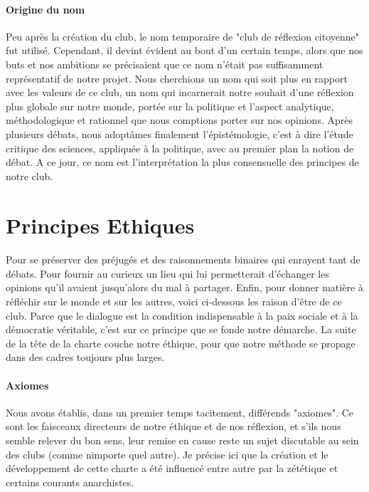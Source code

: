 \documentclass[a4paper,12pt]{article}
\begin{document}
\paragraph{Origine du nom}
Peu après la création du club, le nom temporaire de "club de réflexion citoyenne" fut utilisé. Cependant, il devint évident au bout d'un certain temps, alors que nos buts et nos ambitions se précisaient que ce nom n'était pas suffisamment représentatif de notre projet. Nous cherchions un nom qui soit plus en rapport avec les valeurs de ce club, un nom qui incarnerait notre souhait d'une réflexion plus globale sur notre monde, portée sur la politique et l'aspect analytique, méthodologique et rationnel que nous comptions porter sur nos opinions. Après plusieurs débats, nous adoptâmes finalement l'épistémologie, c'est à dire l'étude critique des sciences, appliquée à la politique, avec au premier plan la notion de débat. A ce jour, ce nom est l'interprétation la plus consensuelle des principes de notre club.
  
\section{Principes Ethiques}
\paragraph{} 
Pour se préserver des préjugés et des raisonnements binaires qui enrayent tant de débats. Pour fournir au curieux un lieu qui lui permetterait d'échanger les opinions qu'il avaient jusqu'alors du mal à partager. Enfin, pour donner matière à réfléchir sur le monde et sur les autres, voici ci-dessous les raison d'être de ce club. Parce que le dialogue est la condition indispensable à la paix sociale et à la démocratie véritable, c'est sur ce principe que se fonde notre démarche. La suite de la tête de la charte couche notre éthique, pour que notre méthode se propage dans des cadres toujours plus larges.

\paragraph{Axiomes}
Nous avons établis, dans un premier temps tacitement, différends "axiomes". Ce sont les faisceaux directeurs de notre éthique et de nos réflexion, et s'ils nous semble relever du bon sens, leur remise en cause reste un sujet discutable au sein des clubs (comme nimporte quel autre). Je précise ici que la création et le développement de cette charte a été influencé entre autre par la zététique et certains courants anarchistes.
\end{document}
